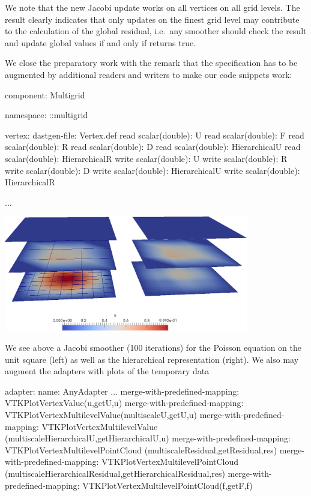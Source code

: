 \noindent
We note that the new Jacobi update works on all vertices on all grid levels. 
The result clearly indicates that only updates on the finest grid level may
contribute to the calculation of the global residual, i.e.~any smoother should
check the result and update global values if and only if
 returns true.


We close the preparatory work with the remark that the specification has to be
augmented by additional readers and writers to make our code snippets work:

\begin{code}
component: Multigrid

namespace: ::multigrid

vertex:
  dastgen-file: Vertex.def
  read scalar(double): U
  read scalar(double): F
  read scalar(double): R
  read scalar(double): D
  read scalar(double): HierarchicalU
  read scalar(double): HierarchicalR
  write scalar(double): U
  write scalar(double): R
  write scalar(double): D
  write scalar(double): HierarchicalU
  write scalar(double): HierarchicalR

...
\end{code}

\begin{center}
  \includegraphics[width=0.8\textwidth]{42_matrix-free-multigrid/Hierarchical-Jacobi.png}
\end{center}

\noindent
We see above a Jacobi smoother (100 iterations) for the Poisson equation on the
unit square (left) as well as the hierarchical representation (right).
We also may augment the adapters with plots of the temporary data 

\begin{code}
adapter:
  name: AnyAdapter
  ...
  merge-with-predefined-mapping: VTKPlotVertexValue(u,getU,u)
  merge-with-predefined-mapping: VTKPlotVertexMultilevelValue(multiscaleU,getU,u)
  merge-with-predefined-mapping: VTKPlotVertexMultilevelValue
    (multiscaleHierarchicalU,getHierarchicalU,u)
  merge-with-predefined-mapping: VTKPlotVertexMultilevelPointCloud
    (multiscaleResidual,getResidual,res)
  merge-with-predefined-mapping: VTKPlotVertexMultilevelPointCloud
    (multiscaleHierarchicalResidual,getHierarchicalResidual,res)
  merge-with-predefined-mapping: VTKPlotVertexMultilevelPointCloud(f,getF,f)
\end{code}

